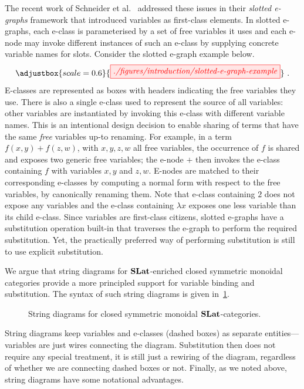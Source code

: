 The recent work of Schneider et al.~\cite{slotted-egraphs} addressed these issues in their \emph{slotted e-graphs} framework that introduced variables as first-class elements.
In slotted e-graphs, each e-class is parameterised by a set of free variables it uses and each e-node may invoke different instances of such an e-class by supplying concrete variable names for slots.
Consider the slotted e-graph example below.
 \[
  \adjustbox{scale=0.6}{
			\tikzfig{./figures/introduction/slotted-e-graph-example}
  }~.
\]
E-classes are represented as boxes with headers indicating the free variables they use.
There is also a single e-class used to represent the source of all variables: other variables are instantiated by invoking this e-class with different variable names.
This is an intentional design decision to enable sharing of terms that have the same \emph{free} variables up-to renaming.
For example, in a term $f(x,y) + f(z,w)$, with $x,y,z,w$ all free variables, the occurrence of $f$ is shared and exposes two generic free variables; the e-node $+$ then invokes the e-class containing $f$ with variables $x,y$ and $z,w$.
E-nodes are matched to their corresponding e-classes by computing a normal form with respect to the free variables, by canonically renaming them.
Note that e-class containing $2$ does not expose any variables and the e-class containing $\lambda x$ exposes one less variable than its child e-class.
Since variables are first-class citizens, slotted e-graphs have a substitution operation built-in that traverses the e-graph to perform the required substitution.
Yet, the practically preferred way of performing substitution is still to use explicit substitution.

We argue that string diagrams for $\mathbf{SLat}$-enriched closed symmetric monoidal categories provide a more principled support for variable binding and substitution.
The syntax of such string diagrams is given in~\cref{fig:egraph-strings-closed}.
\begin{figure}
	\centering
	\caption{String diagrams for closed symmetric monoidal $\mathbf{SLat}$-categories. }
	\label{fig:egraph-strings-closed}
\end{figure}
String diagrams keep variables and e-classes (dashed boxes) as separate entities---variables are just wires connecting the diagram.
Substitution then does not require any special treatment, it is still just a rewiring of the diagram, regardless of whether we are connecting dashed boxes or not.
Finally, as we noted above, string diagrams have some notational advantages.

